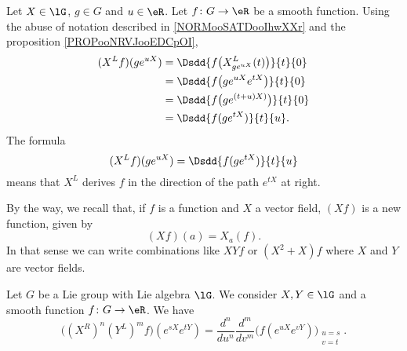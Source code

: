 \begin{normaltext}
	Let \( X\in \lG\), \( g\in G\) and \( u\in \eR\). Let \( f\colon G\to \eR\) be a smooth function. Using the abuse of notation described in \ref{NORMooSATDooIhwXXr} and the proposition \ref{PROPooNRVJooEDCpOI},
	\begin{subequations}
		\begin{align}
			(X^Lf)(g e^{uX}) & =\Dsdd{ f\big( X^L_{g e^{uX}}(t) \big) }{t}{0} \\
			                 & =\Dsdd{ f\big( g e^{uX} e^{tX} \big) }{t}{0}   \\
			                 & =\Dsdd{ f\big( g e^{(t+u)X)} \big)}{t}{0}      \\
			                 & =\Dsdd{ f(g e^{tX}) }{t}{u}.
		\end{align}
	\end{subequations}
	The formula
	\begin{equation}
		(X^Lf)(g e^{uX})=\Dsdd{ f(g e^{tX}) }{t}{u}
	\end{equation}
	means that \( X^L\) derives \( f\) in the direction of the path \(  e^{tX}\) at right.
\end{normaltext}

\begin{normaltext}
	By the way, we recall that, if \( f\) is a function and \( X\) a vector field, \( (Xf)\) is a new function, given by
	\begin{equation}
		(Xf)(a)=X_a(f).
	\end{equation}
	In that sense we can write combinations like \( XYf\) or \( (X^2+X)f\) where \( X\) and \( Y\) are vector fields.
\end{normaltext}

\begin{proposition}       \label{PROPooKSIDooVIFkiM}
	Let \( G\) be a Lie group with Lie algebra \( \lG\). We consider \( X,Y\in \lG\) and a smooth function \( f\colon G\to \eR\). We have
	\begin{equation}
		\big( (X^R)^n(Y^L)^mf \big)( e^{sX} e^{tY})=\frac{ d^n }{ du^n }\frac{ d^m }{ dv^m }\Big( f( e^{uX} e^{vY}) \Big)_{\substack{u=s\\v=t}}.
	\end{equation}
\end{proposition}


